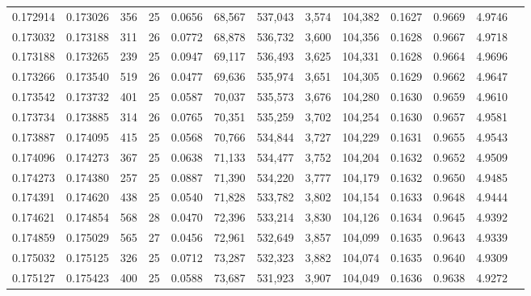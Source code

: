 \begin{tabular}{rrrrrrrrrrrrr}
0.172914 & 0.173026 &   356 &  25 &                                     0.0656 &  68,567 & 537,043 &   3,574 & 104,382 & 0.1627 & 0.9669 & 4.9746 \\
0.173032 & 0.173188 &   311 &  26 &                                     0.0772 &  68,878 & 536,732 &   3,600 & 104,356 & 0.1628 & 0.9667 & 4.9718 \\
0.173188 & 0.173265 &   239 &  25 &                                     0.0947 &  69,117 & 536,493 &   3,625 & 104,331 & 0.1628 & 0.9664 & 4.9696 \\
0.173266 & 0.173540 &   519 &  26 &                                     0.0477 &  69,636 & 535,974 &   3,651 & 104,305 & 0.1629 & 0.9662 & 4.9647 \\
0.173542 & 0.173732 &   401 &  25 &                                     0.0587 &  70,037 & 535,573 &   3,676 & 104,280 & 0.1630 & 0.9659 & 4.9610 \\
0.173734 & 0.173885 &   314 &  26 &                                     0.0765 &  70,351 & 535,259 &   3,702 & 104,254 & 0.1630 & 0.9657 & 4.9581 \\
0.173887 & 0.174095 &   415 &  25 &                                     0.0568 &  70,766 & 534,844 &   3,727 & 104,229 & 0.1631 & 0.9655 & 4.9543 \\
0.174096 & 0.174273 &   367 &  25 &                                     0.0638 &  71,133 & 534,477 &   3,752 & 104,204 & 0.1632 & 0.9652 & 4.9509 \\
0.174273 & 0.174380 &   257 &  25 &                                     0.0887 &  71,390 & 534,220 &   3,777 & 104,179 & 0.1632 & 0.9650 & 4.9485 \\
0.174391 & 0.174620 &   438 &  25 &                                     0.0540 &  71,828 & 533,782 &   3,802 & 104,154 & 0.1633 & 0.9648 & 4.9444 \\
0.174621 & 0.174854 &   568 &  28 &                                     0.0470 &  72,396 & 533,214 &   3,830 & 104,126 & 0.1634 & 0.9645 & 4.9392 \\
0.174859 & 0.175029 &   565 &  27 &                                     0.0456 &  72,961 & 532,649 &   3,857 & 104,099 & 0.1635 & 0.9643 & 4.9339 \\
0.175032 & 0.175125 &   326 &  25 &                                     0.0712 &  73,287 & 532,323 &   3,882 & 104,074 & 0.1635 & 0.9640 & 4.9309 \\
0.175127 & 0.175423 &   400 &  25 &                                     0.0588 &  73,687 & 531,923 &   3,907 & 104,049 & 0.1636 & 0.9638 & 4.9272 \\

\end{tabular}
